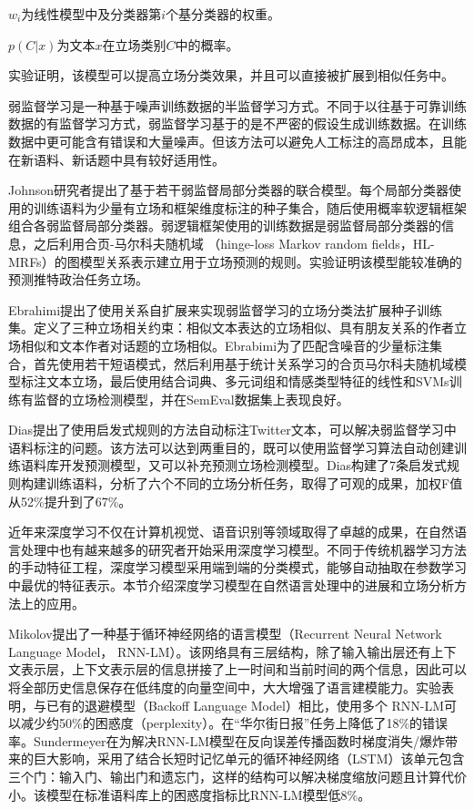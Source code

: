 $w_i$为线性模型中及分类器第$i$个基分类器的权重。

$p(C|x)$为文本$x$在立场类别$C$中的概率。

实验证明，该模型可以提高立场分类效果，并且可以直接被扩展到相似任务中。


弱监督学习是一种基于噪声训练数据的半监督学习方式。不同于以往基于可靠训练数据的有监督学习方式，弱监督学习基于的是不严密的假设生成训练数据。在训练数据中更可能含有错误和大量噪声。但该方法可以避免人工标注的高昂成本，且能在新语料、新话题中具有较好适用性。

Johnson研究者提出了基于若干弱监督局部分类器的联合模型。每个局部分类器使用的训练语料为少量有立场和框架维度标注的种子集合，随后使用概率软逻辑框架组合各弱监督局部分类器。弱逻辑框架使用的训练数据是弱监督局部分类器的信息，之后利用合页-马尔科夫随机域 （hinge-loss Markov random fields，HL- MRFs）的图模型关系表示建立用于立场预测的规则。实验证明该模型能较准确的预测推特政治任务立场。

Ebrahimi提出了使用关系自扩展来实现弱监督学习的立场分类法扩展种子训练集。定义了三种立场相关约束：相似文本表达的立场相似、具有朋友关系的作者立场相似和文本作者对话题的立场相似。Ebrabimi为了匹配含噪音的少量标注集合，首先使用若干短语模式，然后利用基于统计关系学习的合页马尔科夫随机域模型标注文本立场，最后使用结合词典、多元词组和情感类型特征的线性和SVMs训练有监督的立场检测模型，并在SemEval数据集上表现良好。

Dias提出了使用启发式规则的方法自动标注Twitter文本，可以解决弱监督学习中语料标注的问题。该方法可以达到两重目的，既可以使用监督学习算法自动创建训练语料库开发预测模型，又可以补充预测立场检测模型。Dias构建了7条启发式规则构建训练语料，分析了六个不同的立场分析任务，取得了可观的成果，加权F值从52\%提升到了67\%。



近年来深度学习不仅在计算机视觉、语音识别等领域取得了卓越的成果，在自然语言处理中也有越来越多的研究者开始采用深度学习模型。不同于传统机器学习方法的手动特征工程，深度学习模型采用端到端的分类模式，能够自动抽取在参数学习中最优的特征表示。本节介绍深度学习模型在自然语言处理中的进展和立场分析方法上的应用。

Mikolov提出了一种基于循环神经网络的语言模型（Recurrent Neural Network Language Model， RNN-LM）。该网络具有三层结构，除了输入输出层还有上下文表示层，上下文表示层的信息拼接了上一时间和当前时间的两个信息，因此可以将全部历史信息保存在低纬度的向量空间中，大大增强了语言建模能力。实验表明，与已有的退避模型（Backoff Language Model）相比，使用多个 RNN-LM可以减少约50\%的困惑度（perplexity）。在“华尔街日报”任务上降低了18\%的错误率。Sundermeyer在为解决RNN-LM模型在反向误差传播函数时梯度消失/爆炸带来的巨大影响，采用了结合长短时记忆单元的循环神经网络（LSTM）该单元包含三个门：输入门、输出门和遗忘门，这样的结构可以解决梯度缩放问题且计算代价小。该模型在标准语料库上的困惑度指标比RNN-LM模型低8\%。

